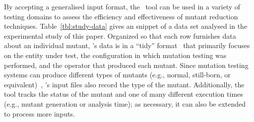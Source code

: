 
By accepting a generalised input format, the \mr~tool can be used in a variety of testing domains to assess the
efficiency and effectiveness of mutant reduction techniques. Table~\ref{tbl:study-data} gives an snippet of a data set
analysed in the experimental study of this paper. Organized so that each row furnishes data about an individual mutant,
\mr's data is in a ``tidy'' format~\cite{Wickham2014} that primarily focuses on the entity under test, the configuration
in which mutation testing was performed, and the operator that produced each mutant. Since mutation testing systems can
produce different types of mutants (e.g., normal, still-born, or equivalent)~\cite{Wright2014}, \mr's input files also
record the type of the mutant. Additionally, the tool tracks the status of the mutant and one of many different
execution times (e.g., mutant generation or analysis time); as necessary, it can also be extended to process more inputs.





% 
% 
% 
